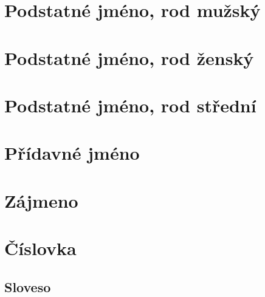 \section{Podstatné jméno, rod mužský}            \label{sec:morpho_m}
{\small{}}
\clearpage

\section{Podstatné jméno, rod ženský}            \label{sec:morpho_f}
{\small{}}
\clearpage

\section{Podstatné jméno, rod střední}           \label{sec:morpho_n}
{\small{}}
\clearpage

\section{Přídavné jméno}                         \label{sec:morpho_adj}
{\small{}}
\clearpage

\section{Zájmeno}                                \label{sec:morpho_pron}
{\small{}}
 
\clearpage

\section{Číslovka}                               \label{sec:morpho_num}
 {\small{}}
\clearpage

\begin{landscape}
\section{Sloveso}                                \label{sec:morpho_v}
{\small{}}
\end{landscape}

\clearpage

\fi


\ifmakebackmatter


